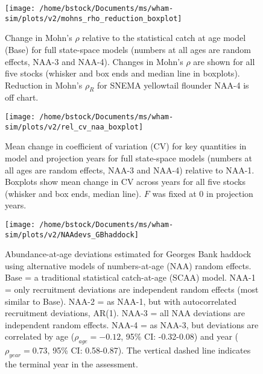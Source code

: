 \documentclass[]{article}
\begin{document}
\begin{figure}

{\centering \texttt{[image: /home/bstock/Documents/ms/wham-sim/plots/v2/mohns\_rho\_reduction\_boxplot]} 

}

\caption{Change in Mohn's $\rho$ relative to the statistical catch at age model (Base) for full state-space models (numbers at all ages are random effects, NAA-3 and NAA-4). Changes in Mohn's $\rho$ are shown for all five stocks (whisker and box ends and median line in boxplots). Reduction in Mohn's $\rho_R$ for SNEMA yellowtail flounder NAA-4 is off chart.}\label{fig:mohns}
\end{figure}

\pagebreak

\begin{figure}

{\centering \texttt{[image: /home/bstock/Documents/ms/wham-sim/plots/v2/rel\_cv\_naa\_boxplot]} 

}

\caption{Mean change in coefficient of variation (CV) for key quantities in model and projection years for full state-space models (numbers at all ages are random effects, NAA-3 and NAA-4) relative to NAA-1. Boxplots show mean change in CV across years for all five stocks (whisker and box ends, median line). $F$ was fixed at 0 in projection years.}\label{fig:cv}
\end{figure}

\pagebreak

\begin{figure}

{\centering \texttt{[image: /home/bstock/Documents/ms/wham-sim/plots/v2/NAAdevs\_GBhaddock]} 

}

\caption{Abundance-at-age deviations estimated for Georges Bank haddock using alternative models of numbers-at-age (NAA) random effects. Base = a traditional statistical catch-at-age (SCAA) model. NAA-1 = only recruitment deviations are independent random effects (most similar to Base). NAA-2 = as NAA-1, but with autocorrelated recruitment deviations, AR(1). NAA-3 = all NAA deviations are independent random effects. NAA-4 = as NAA-3, but deviations are correlated by age ($\rho_{age} = -0.12$, 95\% CI: -0.32-0.08) and year ($\rho_{year} = 0.73$, 95\% CI: 0.58-0.87). The vertical dashed line indicates the terminal year in the assessment.}\label{fig:devs-GBhaddock-naa}
\end{figure}
\end{document}
